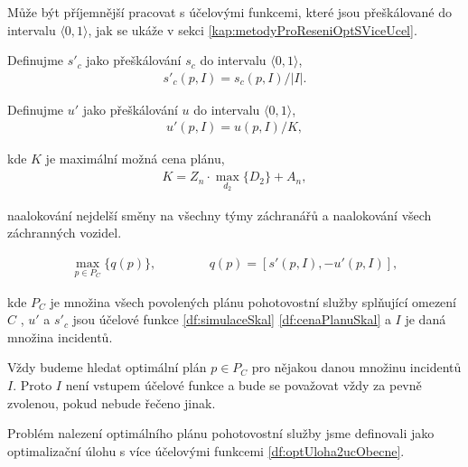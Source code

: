 Může být příjemnější pracovat s účelovými funkcemi, které jsou přeškálované do intervalu $\langle 0, 1 \rangle$, jak se ukáže v sekci \ref{kap:metodyProReseniOptSViceUcel}.

\begin{definice} \label{df:simulaceSkal}
  Definujme $s'_c$ jako přeškálování $s_c$ do intervalu $\langle 0, 1 \rangle$,
  \begin{align*}
    s'_c(p, I) = s_c(p, I) / |I|.
  \end{align*}
\end{definice}

\begin{definice} \label{df:cenaPlanuSkal}
  Definujme $u'$ jako přeškálování $u$ do intervalu $\langle 0, 1 \rangle$,
  \begin{align*}
    u'(p, I) = u(p, I) / K,
  \end{align*}

  kde $K$ je maximální možná cena plánu,
  \begin{align*}
    K = Z_n \cdot \max_{d_2} \{ D_2 \} + A_n,
  \end{align*}

  naalokování nejdelší směny na všechny týmy záchranářů a naalokování všech záchranných vozidel.
\end{definice}

\begin{definice}\label{df:optUloha2uc}
  \begin{align*}
    \max_{p \in P_C} \{ q(p) \}, \hspace{50pt} q(p) = [s'(p, I), -u'(p, I)],
  \end{align*}

  kde $P_C$ je množina všech povolených plánu pohotovostní služby splňující omezení $C$
  , $u'$ a $s'_c$ jsou účelové funkce \ref{df:simulaceSkal} \ref{df:cenaPlanuSkal} a $I$ je daná množina incidentů.
\end{definice}

Vždy budeme hledat optimální plán $p \in P_C$ pro nějakou danou množinu incidentů $I$.
Proto $I$ není vstupem účelové funkce a bude se považovat vždy za pevně zvolenou, pokud nebude řečeno jinak.

Problém nalezení optimálního plánu pohotovostní služby jsme definovali jako optimalizační úlohu s více účelovými funkcemi \ref{df:optUloha2ucObecne}.


